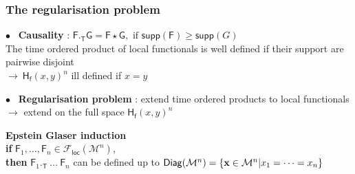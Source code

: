 \documentclass[9pt]{beamer}
\newcommand{\supp}{\mathsf{supp}} %
\newcommand{\Fcal}{\mathcal{F}}
\newcommand{\Mcal}{\mathcal{M}}
\newcommand{\Fsf}{\mathsf{F}}
\newcommand{\Gsf}{\mathsf{G}}
\newcommand{\Hsf}{\mathsf{H}}
\newcommand{\Tsf}{\mathsf{T}}
\newcommand{\fsf}{\mathsf{f}}
\begin{document}

\begin{frame}

\frametitle{The regularisation problem}

\vfill

$\bullet$ \ \textbf{Causality} : \quad $\Fsf ._\Tsf \Gsf = \Fsf \star \Gsf, \mbox{ if } \supp(\Fsf) \geq \supp(G)$ \\
\hspace*{8pt} The time ordered product of local functionals is well defined if their support \hspace*{8pt} are pairwise disjoint \\

\hspace*{8pt} $\to \ \Hsf_\fsf(x,y)^n$  ill defined if $x=y$ \\

\vfill 

$\bullet$ \ \textbf{Regularisation problem} : extend time ordered products to local functionals \\
\hspace*{8pt} $\to$ extend on the full space $\Hsf_\fsf(x,y)^n$

\vspace*{-6pt}

\begin{block}{}
\vspace*{-2ex}
\textbf{Epstein Glaser induction}   \\
\textbf{if} $\Fsf_1, \dots, \Fsf_n \in \Fcal_\mathsf{loc}(\Mcal^n)$, \\
\textbf{then} $\Fsf_1 ._\Tsf \ \dots \ \Fsf_n$ can be defined up to $\mathsf{Diag}(\Mcal^n)=\{{\bf x}\in \Mcal^n  | x_1 = \dots = x_n\}$ \\[5pt]
\vspace*{-1ex}
\end{block}



\vfill

\end{frame}

\end{document}
